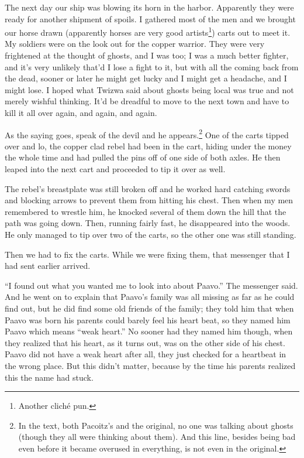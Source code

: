 \tbreak

The next day our ship was blowing its horn in the harbor. Apparently they were ready for another shipment of spoils. I gathered most of the men and we brought our horse drawn (apparently horses are very good artists\footnote{Another clich\'{e} pun.}) carts out to meet it. My soldiers were on the look out for the copper warrior. They were very frightened at the thought of ghosts, and I was too; I was a much better fighter, and it's very unlikely that'd I lose a fight to it, but with all the coming back from the dead, sooner or later he might get lucky and I might get a headache, and I might lose. I hoped what Twizwa said about ghosts being local was true and not merely wishful thinking. It'd be dreadful to move to the next town and have to kill it all over again, and again, and again.

As the saying goes, speak of the devil and he appears.\footnote{In the text, both Pacoitz's and the original, no one was talking about ghosts (though they all were thinking about them). And this line, besides being bad even before it became overused in everything, is not even in the original.} One of the carts tipped over and lo, the copper clad rebel had been in the cart, hiding under the money the whole time and had pulled the pins off of one side of both axles. He then leaped into the next cart and proceeded to tip it over as well.

The rebel's breastplate was still broken off and he worked hard catching swords and blocking arrows to prevent them from hitting his chest. Then when my men remembered to wrestle him, he knocked several of them down the hill that the path was going down. Then, running fairly fast, he disappeared into the woods. He only managed to tip over two of the carts, so the other one was still standing.

Then we had to fix the carts. While we were fixing them, that messenger that I had sent earlier arrived.

``I found out what you wanted me to look into about Paavo.'' The messenger said. And he went on to explain that Paavo's family was all missing as far as he could find out, but he did find some old friends of the family; they told him that when Paavo was born his parents could barely feel his heart beat, so they named him Paavo which means ``weak heart.'' No sooner had they named him though, when they realized that his heart, as it turns out, was on the other side of his chest. Paavo did not have a weak heart after all, they just checked for a heartbeat in the wrong place. But this didn't matter, because by the time his parents realized this the name had stuck.

